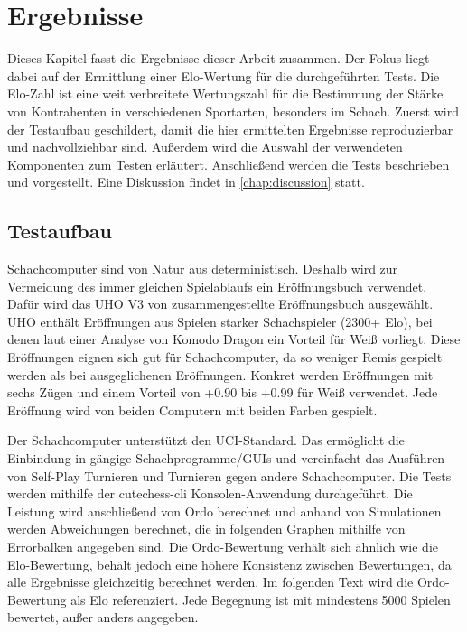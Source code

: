 \chapter{Ergebnisse}
\label{chap:Ergebnisse}

Dieses Kapitel fasst die Ergebnisse dieser Arbeit zusammen. Der Fokus liegt dabei auf der Ermittlung einer Elo-Wertung für die durchgeführten Tests. Die Elo-Zahl ist eine weit verbreitete Wertungszahl für die Bestimmung der Stärke von Kontrahenten in verschiedenen Sportarten, besonders im Schach. Zuerst wird der Testaufbau geschildert, damit die hier ermittelten Ergebnisse reproduzierbar und nachvollziehbar sind. Außerdem wird die Auswahl der verwendeten Komponenten zum Testen erläutert. Anschließend werden die Tests beschrieben und vorgestellt. Eine Diskussion findet in \autoref{chap:discussion} statt.

\section{Testaufbau}

Schachcomputer sind von Natur aus deterministisch. Deshalb wird zur Vermeidung des immer gleichen Spielablaufs ein Eröffnungsbuch verwendet. Dafür wird das \ac{UHO} V3 von \citeauthor{Pohl2021} \cite{Pohl2021} zusammengestellte Eröffnungsbuch ausgewählt. \ac{UHO} enthält Eröffnungen aus Spielen starker Schachspieler (2300+ Elo), bei denen laut einer Analyse von Komodo Dragon \cite{KomodoDragon} ein Vorteil für Weiß vorliegt. Diese Eröffnungen eignen sich gut für Schachcomputer, da so weniger Remis gespielt werden als bei ausgeglichenen Eröffnungen. Konkret werden Eröffnungen mit sechs Zügen und einem Vorteil von +0.90 bis +0.99 für Weiß verwendet. Jede Eröffnung wird von beiden Computern mit beiden Farben gespielt.

Der Schachcomputer unterstützt den \ac{UCI}-Standard. Das ermöglicht die Einbindung in gängige Schachprogramme/GUIs und vereinfacht das Ausführen von Self-Play Turnieren und Turnieren gegen andere Schachcomputer. Die Tests werden mithilfe der cutechess-cli \cite{CutechessRepo} Konsolen-Anwendung durchgeführt. Die Leistung wird anschließend von Ordo \cite{OrdoRepo} berechnet und anhand von Simulationen werden Abweichungen berechnet, die in folgenden Graphen mithilfe von Errorbalken angegeben sind. Die Ordo-Bewertung verhält sich ähnlich wie die Elo-Bewertung, behält jedoch eine höhere Konsistenz zwischen Bewertungen, da alle Ergebnisse gleichzeitig berechnet werden. Im folgenden Text wird die Ordo-Bewertung als Elo referenziert. Jede Begegnung ist mit mindestens 5000 Spielen bewertet, außer anders angegeben.

